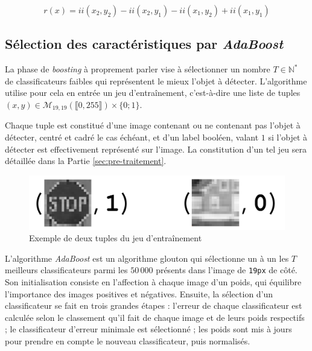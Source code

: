 \documentclass[12pt,a4paper]{article}
\begin{document}
\begin{equation}\label{somme-region}
    r(x) = ii(x_2, y_2) - ii(x_2, y_1) - ii(x_1, y_2) + ii(x_1, y_1)
\end{equation}


\subsection{Sélection des caractéristiques par \textit{AdaBoost}}
La phase de \textit{boosting} à proprement parler vise à sélectionner un nombre $T \in \mathbb{N}^*$ de classificateurs faibles qui représentent le mieux l'objet à détecter. L'algorithme utilise pour cela en entrée un jeu d'entraînement, c'est-à-dire une liste de tuples $(x, y) \in \mathcal{M}_{19, 19}(\llbracket 0, 255 \rrbracket) \times \{0 ; 1\}$. 

Chaque tuple est constitué d'une image contenant ou ne contenant pas l'objet à détecter, centré et cadré le cas échéant, et d'un label booléen, valant $1$ si l'objet à détecter est effectivement représenté sur l'image. La constitution d'un tel jeu sera détaillée dans la Partie \ref{sec:pre-traitement}.

\begin{figure}[h]
    \includegraphics[scale = 0.4]{exemples-jeu-cut}
    \centering
    \caption{Exemple de deux tuples du jeu d'entraînement}
\end{figure}

L'algorithme \textit{AdaBoost} est un algorithme glouton qui sélectionne un à un les $T$ meilleurs classificateurs parmi les $50\,000$ présents dans l'image de \texttt{19px} de côté. Son initialisation consiste en l'affection à chaque image d'un poids, qui équilibre l'importance des images positives et négatives. Ensuite, la sélection d'un classificateur se fait en trois grandes étapes : l'erreur de chaque classificateur est calculée selon le classement qu'il fait de chaque image et de leurs poids respectifs ; le classificateur d'erreur minimale est sélectionné ; les poids sont mis à jours pour prendre en compte le nouveau classificateur, puis normalisés.
\end{document}
